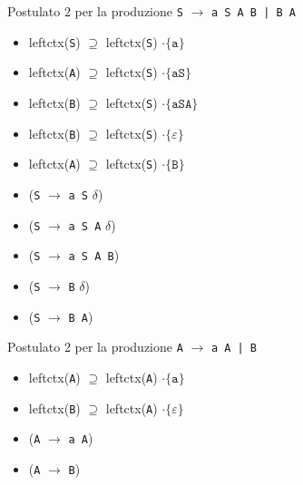 Postulato 2 per la produzione \texttt{S} $\rightarrow$ \texttt{a S A B | B A}
\begin{multicols}{2} 
    \begin{itemize}
        \item leftctx(\texttt{S}) $\supseteq$ leftctx(\texttt{S}) $\cdot \{\texttt{a}\}$
        \item leftctx(\texttt{A}) $\supseteq$ leftctx(\texttt{S}) $\cdot \{\texttt{aS}\}$
        \item leftctx(\texttt{B}) $\supseteq$ leftctx(\texttt{S}) $\cdot \{\texttt{aSA}\}$
        \item leftctx(\texttt{B}) $\supseteq$ leftctx(\texttt{S}) $\cdot \{\varepsilon\}$
        \item leftctx(\texttt{A}) $\supseteq$ leftctx(\texttt{S}) $\cdot \{\texttt{B}\}$
    \end{itemize}
    \columnbreak
    \begin{itemize}
        \item[] (\texttt{S} $\rightarrow$ \texttt{a S} $\delta$)
        \item[] (\texttt{S} $\rightarrow$ \texttt{a S A} $\delta$)
        \item[] (\texttt{S} $\rightarrow$ \texttt{a S A B})
        \item[] (\texttt{S} $\rightarrow$ \texttt{B} $\delta$)
        \item[] (\texttt{S} $\rightarrow$ \texttt{B A})
    \end{itemize}
\end{multicols}
\setlist{}

Postulato 2 per la produzione \texttt{A} $\rightarrow$ \texttt{a A | B}
\begin{multicols}{2} 
    \begin{itemize}
        \item leftctx(\texttt{A}) $\supseteq$ leftctx(\texttt{A}) $\cdot \{\texttt{a}\}$
        \item leftctx(\texttt{B}) $\supseteq$ leftctx(\texttt{A}) $\cdot \{\varepsilon\}$
    \end{itemize}
    \columnbreak
    \begin{itemize}
        \item[] (\texttt{A} $\rightarrow$ \texttt{a A})
        \item[] (\texttt{A} $\rightarrow$ \texttt{B})
    \end{itemize}
\end{multicols}
\setlist{}

